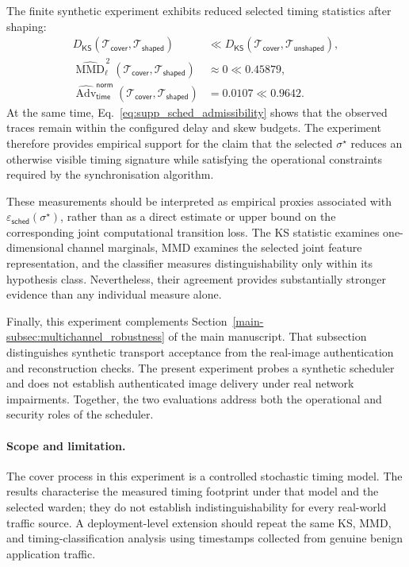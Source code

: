 \documentclass[journal]{IEEEtran}
\theoremstyle{definition}
\theoremstyle{game}
\begin{document}
The finite synthetic experiment exhibits reduced selected timing
statistics after shaping:
\begin{align}
D_{\mathsf{KS}}
\!\left(
\mathcal T_{\mathsf{cover}},
\mathcal T_{\mathsf{shaped}}
\right)
&\ll
D_{\mathsf{KS}}
\!\left(
\mathcal T_{\mathsf{cover}},
\mathcal T_{\mathsf{unshaped}}
\right),\\
\widehat{\operatorname{MMD}}_{\ell}^{\,2}
\!\left(
\mathcal T_{\mathsf{cover}},
\mathcal T_{\mathsf{shaped}}
\right)
&\approx 0
\ll
0.45879,\\
\widehat{\operatorname{Adv}}_{\mathsf{time}}^{\mathsf{norm}}
\!\left(
\mathcal T_{\mathsf{cover}},
\mathcal T_{\mathsf{shaped}}
\right)
&=
0.0107
\ll
0.9642.
\end{align}
At the same time, Eq.~\eqref{eq:supp_sched_admissibility} shows that
the observed traces remain within the configured delay and skew
budgets. The experiment therefore provides empirical support for the
claim that the selected $\sigma^\star$ reduces an otherwise visible
timing signature while satisfying the operational constraints required
by the synchronisation algorithm.

These measurements should be interpreted as empirical proxies
associated with
$\varepsilon_{\mathsf{sched}}(\sigma^\star)$, rather than as a direct
estimate or upper bound on the corresponding joint computational transition loss.
The KS statistic examines one-dimensional channel marginals, MMD
examines the selected joint feature representation, and the classifier
measures distinguishability only within its hypothesis class.
Nevertheless, their agreement provides substantially stronger evidence
than any individual measure alone.

Finally, this experiment complements
Section~\ref{main-subsec:multichannel_robustness} of the main manuscript. That subsection distinguishes synthetic transport acceptance from
the real-image authentication and reconstruction checks. The
present experiment probes a synthetic scheduler and does not establish
authenticated image delivery under real network impairments. Together, the two evaluations
address both the operational and security roles of the scheduler.

\paragraph{Scope and limitation.}
The cover process in this experiment is a controlled stochastic timing
model. The results characterise the measured timing footprint under that
model and the selected warden; they do not establish indistinguishability
for every real-world traffic source. A deployment-level extension should repeat the same
KS, MMD, and timing-classification analysis using timestamps collected
from genuine benign application traffic.
\end{document}
